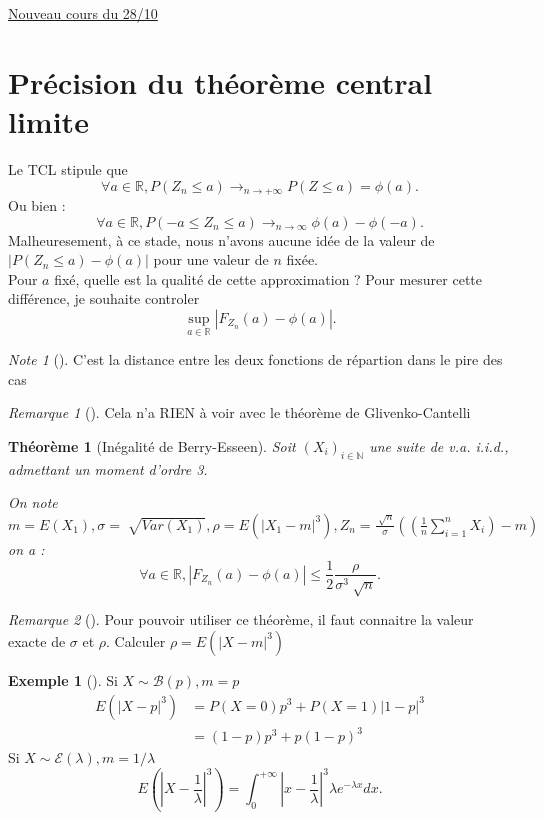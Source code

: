\documentclass{article}
\theoremstyle{plain}%
\newtheorem{thm}{Théorème}[section]
\theoremstyle{definition}
\newtheorem{exmp}{Exemple}[section]
\theoremstyle{remark}
\newtheorem*{rem}{Remarque}
\newtheorem*{note}{Note}
\begin{document}
\underline{Nouveau cours du 28/10} \\

\section{Précision du théorème central limite }
Le TCL stipule que 
\[
    \forall a \in \mathbb{R}, P(Z_n \leq a) \to_{n \to +\infty } P(Z \leq a) = \phi (a)
.\]
Ou bien : 
\[
    \forall a \in \mathbb{R}, P(-a \leq Z_n \leq a) \to _{n \to \infty } \phi (a) - \phi (-a)
.\]
Malheuresement, à ce stade, nous n'avons aucune idée de la valeur de $ \left| P(Z_n \leq a) - \phi (a) \right|  $ pour une valeur de $ n $ fixée. \\
Pour $ a $ fixé, quelle est la qualité de cette approximation ? Pour mesurer cette différence, je souhaite controler 
\[
    \sup_{a \in \mathbb{R}} \left| F_{Z_n}(a) - \phi (a) \right| 
.\]
\begin{note}[]
    C'est la distance entre les deux fonctions de répartion dans le pire des cas
\end{note}
\begin{rem}[]
    Cela n'a RIEN à voir avec le théorème de Glivenko-Cantelli
\end{rem}

\begin{thm}[Inégalité de Berry-Esseen]
    Soit $ (X_i)_ {i \in \mathbb{N}} $ une suite de v.a. i.i.d., admettant un moment d'ordre 3.

    On note  $ m = E(X_1), \sigma =\sqrt[]{Var(X_1)}, \rho = E( \left| X_1-m \right| ^3), Z_n = \frac{\sqrt[]{n}}{\sigma } ((\frac{1}{n}\sum_{i=1}^{n}X_i) - m)$ on a :
    \[
        \forall a \in \mathbb{R}, \left| F_{Z_n}(a) - \phi (a) \right| \leq \frac{1}{2}\frac{\rho }{\sigma ^3 \sqrt[]{n}}
    .\]
\end{thm}
\begin{rem}[]
    Pour pouvoir utiliser ce théorème, il faut connaitre la valeur exacte de $ \sigma  $ et $ \rho $. Calculer $ \rho = E(\left| X-m \right| ^3) $ 
    \begin{exmp}[]
        Si $ X \sim \mathcal{B}(p), m=p $ \begin{align*}
            E( \left| X-p \right| ^3) &= P(X=0) p^3 + P(X=1) \left| 1-p \right| ^3 \\
                            &= (1-p)p^3 + p(1-p)^3
        \end{align*}
        Si $ X \sim \mathcal{E}(\lambda ), m=1/\lambda  $ 
        \[
            E(\left| X - \frac{1}{\lambda } \right| ^3) = \int_{0}^{+\infty }\left| x-\frac{1}{\lambda } \right| ^3 \lambda e^{-\lambda x}dx
        .\]
    \end{exmp}
\end{rem}
\end{document}
